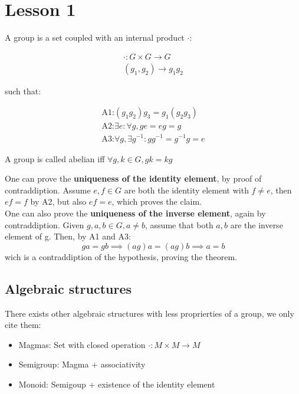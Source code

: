 \section{Lesson 1}
\begin{definition}
  
A group is a set coupled with an internal product $ \cdot $:

\begin{gather}
 \cdot : G \times G \rightarrow G \\
 (g_1, g_2) \rightarrow g_1 g_2
\end{gather}

 such that:

 \begin{gather}
  \text{A1:} (g_1 g_2) g_3 = g_1 (g_2 g_3) \\
  \text{A2:}\exists e : \forall g , ge = eg = g \\
  \text{A3:}\forall g, \exists g^{-1} : gg^{-1}  = g^{-1}g = e
 \end{gather}

\end{definition}
\begin{definition}
  
A group is called abelian iff $\forall g,k \in G, gk = kg$
\end{definition}
One can prove  the {\bf uniqueness of the identity element}, by proof of contraddiption. Assume $e,f \in G$ are both the identity element with $f \neq e$, then $ef = f$ by A2, but also $ef = e$, which proves the claim.
\\
One can also prove the {\bf uniqueness of the inverse element}, again by contraddiption. Given $g, a, b \in G, a \neq b$, assume that both $a,b$ are the inverse element of g. Then, by A1 and A3:
\[
  ga = gb \implies (ag)a = (ag)b \implies a = b
\]
wich is a contraddiption of the hypothesis, proving the theorem.
\subsection{Algebraic structures}
There exists other algebraic structures with less proprierties of a group, we only cite them:
\begin{itemize}
  \item Magmas: Set with closed operation $\cdot : M \times M \rightarrow M $
  \item Semigroup: Magma + associativity
  \item Monoid: Semigoup + existence of the identity element
\end{itemize}

